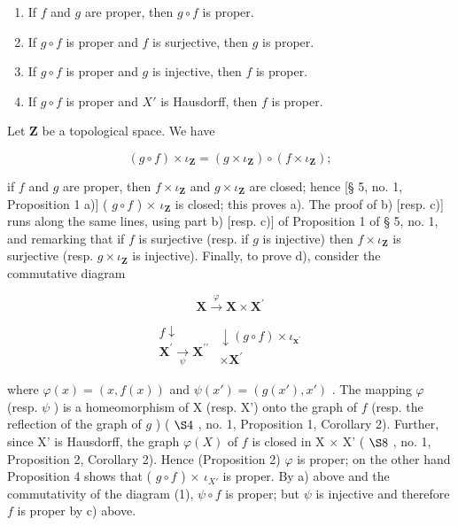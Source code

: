 \begin{enumerate}
\def\labelenumi{\alph{enumi})}
\item
  If \(f\) and \(g\) are proper, then \(g \circ f\) is proper.
\item
  If \(g \circ f\) is proper and \(f\) is surjective, then \(g\) is proper.
\item
  If \(g \circ f\) is proper and \(g\) is injective, then \(f\) is proper.
\item
  If \(g \circ f\) is proper and \(X'\) is Hausdorff, then \(f\) is proper.
\end{enumerate}

Let \(\mathbf{Z}\) be a topological space. We have

\[
(g \circ f) \times \iota_ {\mathbf {Z}} = (g \times \iota_ {\mathbf {Z}}) \circ (f \times \iota_ {\mathbf {Z}});
\]

if \(f\) and \(g\) are proper, then \(f \times \iota_{\mathbf{Z}}\) and \(g \times \iota_{\mathbf{Z}}\) are closed; hence {[}§ 5, no. 1, Proposition 1 a){]} ( \(g \circ f\) ) × \(\iota_{\mathbf{Z}}\) is closed; this proves a). The proof of b) {[}resp. c){]} runs along the same lines, using part b) {[}resp. c){]} of Proposition 1 of § 5, no. 1, and remarking that if \(f\) is surjective (resp. if \(g\) is injective) then \(f \times \iota_{\mathbf{Z}}\) is surjective (resp. \(g \times \iota_{\mathbf{Z}}\) is injective). Finally, to prove d), consider the commutative diagram

\[
\mathbf {X} \stackrel {\varphi} {\rightarrow} \mathbf {X} \times \mathbf {X} ^ {\prime}\tag{1}
\]

\[
\begin{array}{c} f \downarrow \\ \mathbf {X} ^ {\prime} \xrightarrow [ \psi ]{} \mathbf {X} ^ {\prime \prime} \end{array} \begin{array}{c} \downarrow (g \circ f) \times \iota_ {\mathbf {x} ^ {\prime}} \\ \times \mathbf {X} ^ {\prime} \end{array}
\]

where \(\varphi(x) = (x, f(x))\) and \(\psi(x') = (g(x'), x')\) . The mapping \(\varphi\) (resp. \(\psi\) ) is a homeomorphism of X (resp. X') onto the graph of \(f\) (resp. the reflection of the graph of \(g\) ) ( \(\S 4\) , no. 1, Proposition 1, Corollary 2). Further, since X' is Hausdorff, the graph \(\varphi(X)\) of \(f\) is closed in X × X' ( \(\S 8\) , no. 1, Proposition 2, Corollary 2). Hence (Proposition 2) \(\varphi\) is proper; on the other hand Proposition 4 shows that ( \(g \circ f\) ) × \(\iota_{X'}\) is proper. By a) above and the commutativity of the diagram (1), \(\psi \circ f\) is proper; but \(\psi\) is injective and therefore \(f\) is proper by c) above.

